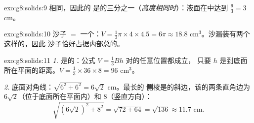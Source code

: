 \begin{solution}{exo:g8:solids:9}
相同，因此的
是的三分之一（\emph{高度相同时}）：液面在中达到
$\frac{9}{3} = 3$ cm。
\end{solution}

\begin{solution}{exo:g8:solids:10}
沙子 $=$ 一个：$V = \frac13 \pi \times 4 \times 4.5 = 6\pi
\approx 18.8$ cm$^3$。沙漏装有两个这样的，因此
沙子恰好占据内部总的。
\end{solution}

\begin{solution}{exo:g8:solids:11}
\emph{1.} 是的：公式 $V = \frac13 Bh$ 对的任意位置都成立，
只要 $h$ 是到底面
所在平面的距离。$V = \frac13 \times 36 \times 8 = 96$ cm$^3$。

\emph{2.} 底面对角线：$\sqrt{6^2 + 6^2} = 6\sqrt2$ cm。最长的
侧棱是的斜边，该的两条直角边为
$6\sqrt2$（位于底面所在平面内）和 $8$（竖直方向）：
\[
\sqrt{(6\sqrt2)^2 + 8^2} = \sqrt{72 + 64} = \sqrt{136} \approx 11.7
\text{ cm}.
\]
\end{solution}

